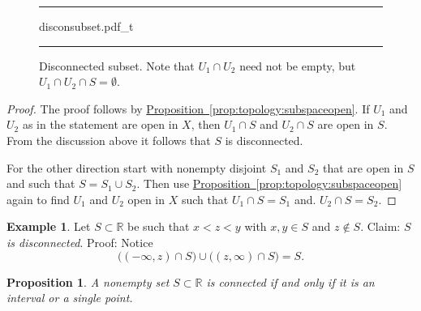\documentclass[12pt,openany]{book}
\newcommand{\R}{{\mathbb{R}}}
\theoremstyle{plain}
\newtheorem{prop}[thm]{Proposition}
\theoremstyle{remark}
\theoremstyle{definition}
\newenvironment{myfig}{%
\begin{figure}[h!t]
\noindent\rule{\textwidth}{0.4pt}\vspace{12pt}\par\centering}%
{\par\noindent\rule{\textwidth}{0.4pt}
\end{figure}}
\theoremstyle{exercise}
\theoremstyle{example}
\newtheorem{example}[thm]{Example}
\newcommand{\propref}[1]{\hyperref[#1]{Proposition~\ref*{#1}}}
\begin{document}
\begin{myfig}
{disconsubset.pdf_t}
\caption{Disconnected subset.  Note that $U_1 \cap U_2$ need
not be empty, but $U_1 \cap U_2 \cap S = \emptyset$.\label{fig:disconsubset}}
\end{myfig}


\begin{proof}
The proof follows by \propref{prop:topology:subspaceopen}.
If $U_1$ and $U_2$ as in the statement are open in $X$,
then $U_1 \cap S$ and $U_2 \cap S$ are open in $S$.
From the discussion above it follows that $S$ is disconnected.

For the other direction start with nonempty disjoint $S_1$ and $S_2$ that are
open in $S$ and such that $S = S_1 \cup S_2$.  Then use
\propref{prop:topology:subspaceopen} again to find $U_1$ and $U_2$
open in $X$ such that $U_1 \cap S = S_1$ and.
$U_2 \cap S = S_2$.
\end{proof}

\begin{example}
Let $S \subset \R$ be such that $x < z < y$ with $x,y \in S$
and $z \notin S$.  Claim: \emph{$S$ is disconnected}.  Proof:  Notice
\begin{equation*}
\bigl( (-\infty,z) \cap S \bigr)
\cup
\bigl( (z,\infty) \cap S \bigr)
= S .
\end{equation*}
\end{example}

\begin{prop}
A nonempty set $S \subset \R$ is connected if and only if it is
an interval or a single point.
\end{prop}
\end{document}
